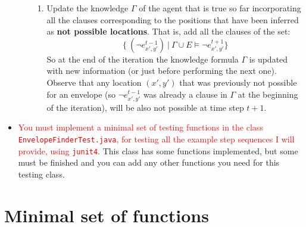 \documentclass{tufte-handout}
\begin{document}
\begin{fullwidth}
\begin{itemize}
\begin{enumerate}
\begin{enumerate}
\item Update the knowledge $\Gamma$ of the agent that
is true so far  incorporating
all the clauses corresponding to the positions that have been
 inferred as {\bf not possible locations}. That is, add all the
clauses of the set:
$$
 \{ \ (\neg e_{x',y'}^{t-1}) \ | \ \Gamma \cup E
    \models \neg  e_{x',y'}^{t+1} \} $$
So at the end of the iteration the knowledge formula $\Gamma$ is
updated with new information (or just before performing the next one).
Observe that any location $(x',y')$ that was previously not possible for an envelope
(so $ \neg e_{x',y'}^{t-1} $ was already a clause in $\Gamma$ at the beginning of
the iteration), will be also not possible at time step $t+1$.
\end{enumerate}
\end{enumerate}
\item  \textcolor{red}{You must implement a minimal set of testing functions in the class
{\tt EnvelopeFinderTest.java}, for testing all the example step sequences I will provide,
 using {\tt junit4}}. This class has some functions
implemented, but some must be finished and you can add any other functions you need for this
testing class.
\end{itemize}
\end{fullwidth}

\section{Minimal set of functions}
\end{document}
